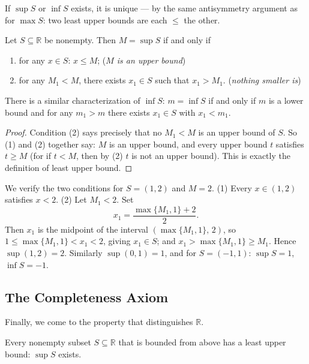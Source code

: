 \documentclass[11pt]{report}
\begin{document}
\begin{rembox}
If $\sup S$ or $\inf S$ exists, it is unique --- by the same antisymmetry argument as for $\max S$: two least upper bounds are each $\leq$ the other.
\end{rembox}

\begin{propbox}
Let $S \subseteq \mathbb{R}$ be nonempty. Then $M = \sup S$ if and only if
\begin{enumerate}[label=(\arabic*)]
    \item for any $x \in S$: $x \leq M$; \hfill (\emph{$M$ is an upper bound})
    \item for any $M_1 < M$, there exists $x_1 \in S$ such that $x_1 > M_1$. \hfill (\emph{nothing smaller is})
\end{enumerate}
There is a similar characterization of $\inf S$: $m = \inf S$ if and only if $m$ is a lower bound and for any $m_1 > m$ there exists $x_1 \in S$ with $x_1 < m_1$.
\end{propbox}

\begin{proof}
Condition (2) says precisely that no $M_1 < M$ is an upper bound of $S$. So (1) and (2) together say: $M$ is an upper bound, and every upper bound $t$ satisfies $t \geq M$ (for if $t < M$, then by (2) $t$ is not an upper bound). This is exactly the definition of least upper bound.
\end{proof}

\begin{exbox}
We verify the two conditions for $S = (1,2)$ and $M = 2$. (1) Every $x \in (1,2)$ satisfies $x < 2$. (2) Let $M_1 < 2$. Set
\[
x_1 = \frac{\max\{M_1, 1\} + 2}{2}.
\]
Then $x_1$ is the midpoint of the interval $(\max\{M_1,1\},\, 2)$, so $1 \leq \max\{M_1,1\} < x_1 < 2$, giving $x_1 \in S$; and $x_1 > \max\{M_1,1\} \geq M_1$. Hence $\sup(1,2) = 2$. Similarly $\sup(0,1) = 1$, and for $S = (-1,1)$: $\sup S = 1$, $\inf S = -1$.
\end{exbox}

\subsection{The Completeness Axiom}

Finally, we come to the property that distinguishes $\mathbb{R}$.

\begin{defbox}
Every nonempty subset $S \subseteq \mathbb{R}$ that is bounded from above has a least upper bound: $\sup S$ exists.
\end{defbox}
\end{document}
